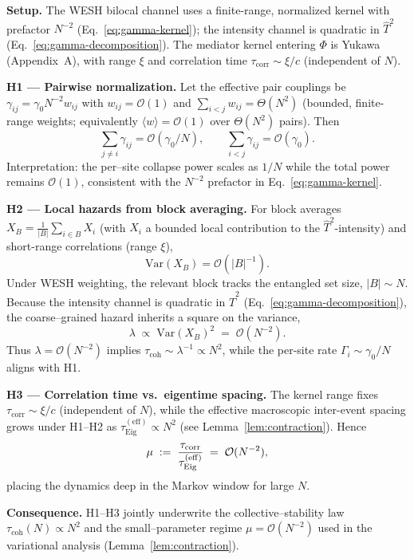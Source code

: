 \documentclass[12pt,a4paper]{article}
\newcommand{\corr}{\mathrm{corr}}
\newcommand{\coh}{\mathrm{coh}}
\numberwithin{equation}{section}
\begin{document}
\noindent\textbf{Setup.} The WESH bilocal channel uses a finite-range, normalized kernel with prefactor $N^{-2}$ (Eq.~\eqref{eq:gamma-kernel}); the intensity channel is quadratic in $\hat T^2$ (Eq.~\eqref{eq:gamma-decomposition}). The mediator kernel entering $\Phi$ is Yukawa (Appendix~A), with range $\xi$ and correlation time $\tau_{\corr}\sim \xi/c$ (independent of $N$).

\vspace{0.6em}
\noindent\textbf{H1 — Pairwise normalization.} Let the effective pair couplings be $\gamma_{ij}=\gamma_0 N^{-2} w_{ij}$ with $w_{ij}=\mathcal O(1)$ and $\sum_{i<j} w_{ij}=\Theta(N^2)$ (bounded, finite-range weights; equivalently $\langle w\rangle=\mathcal O(1)$ over $\Theta(N^2)$ pairs). Then
\[
\sum_{j\ne i}\gamma_{ij}=\mathcal O(\gamma_0/N),
\qquad
\sum_{i<j}\gamma_{ij}=\mathcal O(\gamma_0).
\]
Interpretation: the per–site collapse power scales as $1/N$ while the total power remains $\mathcal O(1)$, consistent with the $N^{-2}$ prefactor in Eq.~\eqref{eq:gamma-kernel}.

\vspace{0.6em}
\noindent\textbf{H2 — Local hazards from block averaging.} For block averages $X_B=\frac{1}{|B|}\sum_{i\in B}X_i$ (with $X_i$ a bounded local contribution to the $\hat T^2$-intensity) and short-range correlations (range $\xi$),
\[
\mathrm{Var}(X_B)=\mathcal O(|B|^{-1}).
\]
Under WESH weighting, the relevant block tracks the entangled set size, $|B|\sim N$. Because the intensity channel is quadratic in $\hat T^2$ (Eq.~\eqref{eq:gamma-decomposition}), the coarse–grained hazard inherits a square on the variance,
\[
\lambda \;\propto\; \mathrm{Var}(X_B)^2 \;=\; \mathcal O(N^{-2}).
\]
Thus $\lambda=\mathcal O(N^{-2})$ implies $\tau_{\mathrm{coh}}\sim\lambda^{-1}\propto N^2$, while the per-site rate $\Gamma_i\sim \gamma_0/N$ aligns with H1.

\vspace{0.6em}
\noindent\textbf{H3 — Correlation time vs.\ eigentime spacing.} The kernel range fixes $\tau_{\mathrm{corr}}\sim \xi/c$ (independent of $N$), while the effective macroscopic inter-event spacing grows under H1–H2 as $\tau_{\mathrm{Eig}}^{(\mathrm{eff})}\propto N^{2}$ (see Lemma~\ref{lem:contraction}). Hence
\[
\mu \;:=\; \frac{\tau_{\corr}}{\tau_{\rm Eig}^{(\mathrm{eff})}} \;=\; \mathcal O(N^{-2}),
\]
placing the dynamics deep in the Markov window for large $N$.

\vspace{0.6em}
\noindent\textbf{Consequence.} H1–H3 jointly underwrite the collective–stability law $\tau_{\coh}(N)\propto N^{2}$ and the small–parameter regime $\mu=\mathcal O(N^{-2})$ used in the variational analysis (Lemma~\ref{lem:contraction}).
\end{document}
